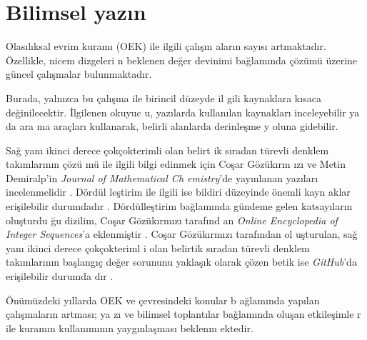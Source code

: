 \documentclass[a4paper,10pt]{article}
\begin{document}
\section{Bilimsel yaz\i n}

Olas\i l\i ksal evrim kuram{\i} (OEK) ile ilgili \c{c}al\i \c{s}m%
alar\i n say{\i}s{\i} artmaktad\i r. \"Ozellikle, nicem dizgeleri%
n beklenen de\u{g}er devinimi ba\u{g}lam\i nda \c{c}\"oz\"um\"u %
\"uzerine g\"uncel \c{c}al\i \c{s}malar bulunmaktad\i r. %

Burada, yaln\i zca bu \c{c}al\i \c{s}ma ile birincil d\"uzeyde il%
gili kaynaklara k\i saca de\u{g}inilecektir. \.Ilgile\-nen okuyuc%
u, yaz\i larda kullan\i lan kaynaklar{\i} inceleyebilir ya da ara%
ma ara\c{c}lar{\i} kullanarak, belirli alanlarda derinle\c{s}me y%
oluna gidebilir. %

Sa\u{g} yan{\i} ikinci derece \c{c}ok\c{c}okterimli olan belir\-t%
ik s\i radan t\"urevli denklem tak\i mlar{\i}n\i n \c{c}\"o\-z\"u%
m\"u ile ilgili bilgi edinmek i\c{c}in Co\c{s}ar G\"o\-z\"uk\i rm%
{\i}z{\i} ve Metin Demiralp'in \textit{Journal of Mathematical Ch%
emistry}'de yay\i nlanan yaz\i lar{\i} incelenmelidir %
\cite{p1,p2}. D\"ord\"ul%
le\c{s}\-ti\-rim ile ilgili ise bildiri d\"uzeyinde \"onemli kayn%
aklar eri\c{s}ilebilir durum\-da\-d\i r \cite{MD2014Dec,cg2015, 
mek2015}. %
D\"ord\"ulle\c{s}tirim %
ba\u{g}lam\i nda g\"undeme gelen katsay\i lar\i n o\-lu\c{s}turdu%
\u{g}u dizilim, Co\c{s}ar G\"oz\"uk\i rm\i z{\i} ta\-ra\-f\i n\-d%
an \textit{Online Encyclopedia of Integer Sequences}'a 
ek\-len\-mi\c{s}tir \cite{encent, enc}. %
Co\c{s}ar G\"oz\"uk\i rm\i z{\i} ta\-raf\i n\-dan o\-l%
u\c{s}turulan, sa\u{g} yan{\i} ikinci derece \c{c}ok\c{c}okteriml%
i olan belirtik s\i ra\-dan t\"urevli denklem tak\i mlar\i n\i n %
ba\c{s}lang\i \c{c} de\-\u{g}er so\-rununu yakla\c{s}\i k olarak %
\c{c}\"ozen betik ise \textit{GitHub}'da eri\c{s}ilebilir durumda%
d\i r \cite{code}. %

\"On\"um\"uzdeki y\i llarda OEK ve \c{c}ev\-re\-sindeki konular b%
a\u{g}lam\i nda yap\i lan \c{c}al\i \c{s}malar\i n artmas{\i}; ya%
z{\i} ve bilimsel toplant\i lar ba\u{g}lam\i nda olu\c{s}an 
etkile\c{s}imle%
r ile kuram\i n kullan\i m\i n\i n yayg\i nla\c{s}mas{\i} beklenm%
ektedir. %

  


\end{document}
